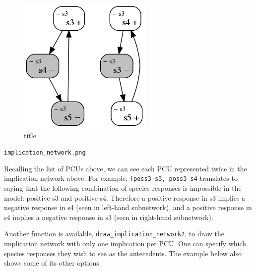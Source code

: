 \documentclass[11pt]{article}
\makeatletter
\def\maxwidth{\ifdim\Gin@nat@width>\linewidth\linewidth
    \else\Gin@nat@width\fi}
\let\Oldincludegraphics\includegraphics
\renewcommand{\includegraphics}[1]{\Oldincludegraphics[width=.8\maxwidth]{#1}}
\makeatother
\begin{document}
    \begin{figure}
\centering
\includegraphics{implication_network.png}
\caption{title}
\end{figure}

\texttt{implication\_network.png}

    Recalling the list of PCUs above, we can see each PCU represented twice
in the implication network above. For example,
\texttt{{[}\textquotesingle{}poss3\_s3\textquotesingle{},\ \textquotesingle{}poss3\_s4\textquotesingle{}{]}}
translates to saying that the following combination of species responses
is impossible in the model: positive s3 and positive s4. Therefore a
positive response in s3 implies a negative response in s4 (seen in
left-hand subnetwork), and a positive response in s4 implies a negative
response in s3 (seen in right-hand subnetwork).

Another function is available, \texttt{draw\_implication\_network2}, to
draw the implication network with only one implication per PCU. One can
specify which species responses they wish to see as the antecedents. The
example below also shows some of its other options.
\end{document}
